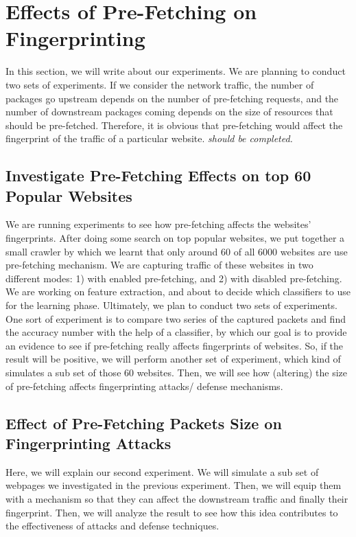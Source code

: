 \documentclass{sig-alternate-05-2015}
\begin{document}
\section{Effects of Pre-Fetching on Fingerprinting}
In this section, we will write  about our experiments. We are planning to conduct two sets of experiments. If we consider the network traffic, the number of packages go upstream depends on the number of pre-fetching requests, and the number of downstream packages coming depends on the size of resources that should be pre-fetched. Therefore, it is obvious that pre-fetching would affect the fingerprint of the traffic of a particular website.  \emph{should be completed.}

\subsection{Investigate Pre-Fetching Effects on top 60 Popular Websites}
We are running experiments to see how pre-fetching affects the websites' fingerprints.
After doing some search on top popular websites, we put together a small crawler by which we learnt that only around 60 of all 6000 websites are use pre-fetching mechanism. We are capturing traffic of these websites in two different modes: 1) with enabled pre-fetching, and 2) with disabled pre-fetching. We are working on feature extraction, and about to decide which classifiers to use for the learning phase.
Ultimately, we plan to conduct two sets of experiments. One sort of experiment is to compare two series of the captured packets and find the accuracy number with the help of a classifier, by which our goal is to provide an evidence to see if pre-fetching really affects fingerprints of websites. So, if the result will be positive, we will perform another set of experiment, which kind of simulates a sub set of those 60 websites. Then, we will see how (altering) the size of pre-fetching affects fingerprinting attacks/ defense mechanisms.


\subsection{Effect of Pre-Fetching Packets Size on Fingerprinting Attacks}
Here, we will explain our second experiment. We will simulate a sub set of webpages we investigated in the previous experiment. Then, we will equip them with a mechanism so that they can affect the downstream traffic and finally their fingerprint. Then, we will analyze the result to see how this idea contributes to the effectiveness of attacks and defense techniques.
\end{document}
